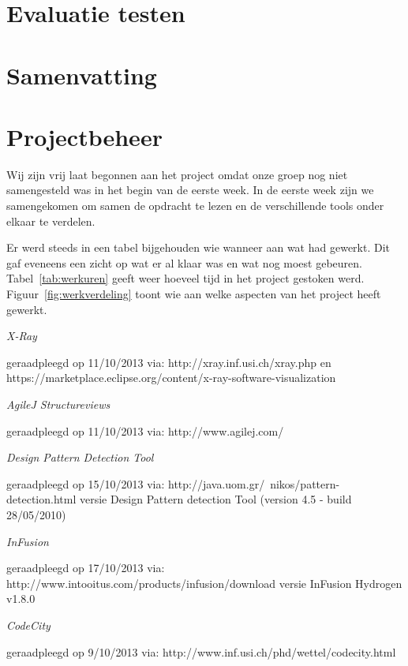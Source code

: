 \documentclass[i1]{oss}
\begin{document}
\section{Evaluatie testen}

\section{Samenvatting}

\section{Projectbeheer}

Wij zijn vrij laat begonnen aan het project omdat onze groep nog niet samengesteld was in het begin van de eerste week. In de eerste week zijn we samengekomen om samen de opdracht te lezen en de verschillende tools onder elkaar te verdelen. 

Er werd steeds in een tabel bijgehouden wie wanneer aan wat had gewerkt. Dit gaf eveneens een zicht op wat er al klaar was en wat nog moest gebeuren. \\
Tabel~\ref{tab:werkuren} geeft weer hoeveel tijd in het project gestoken werd. Figuur~\ref{fig:werkverdeling} toont wie aan welke aspecten van het project heeft gewerkt.

\newpage
\begin{flushleft}
\begin{thebibliography}{4}

\emph{X-Ray}
\begin{scriptsize}
geraadpleegd op 11/10/2013 via: \mbox{http://xray.inf.usi.ch/xray.php} en \mbox{https://marketplace.eclipse.org/content/x-ray-software-visualization}
\end{scriptsize}

\emph{AgileJ Structureviews}
\begin{scriptsize}
geraadpleegd op 11/10/2013 via: \mbox{http://www.agilej.com/}
\end{scriptsize}

\emph{Design Pattern Detection Tool}
\begin{scriptsize}
geraadpleegd op 15/10/2013 via: \mbox{http://java.uom.gr/~nikos/pattern-detection.html} versie  Design Pattern detection Tool (version 4.5 - build 28/05/2010)
\end{scriptsize}

\emph{InFusion}
\begin{scriptsize}
geraadpleegd op 17/10/2013 via: \mbox{http://www.intooitus.com/products/infusion/download} versie InFusion Hydrogen v1.8.0
\end{scriptsize}

\emph{CodeCity}
\begin{scriptsize}
geraadpleegd op 9/10/2013 via: \mbox{http://www.inf.usi.ch/phd/wettel/codecity.html} 
\end{scriptsize}

\end{thebibliography}
\end{flushleft}
\end{document}

